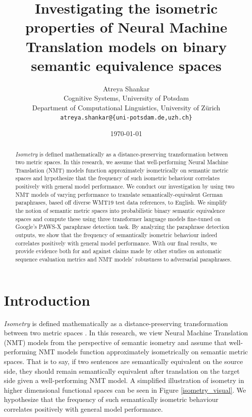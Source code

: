 \documentclass[11pt,a4paper]{article}
\title{Investigating the isometric properties of Neural Machine Translation models on binary semantic equivalence spaces}
\author{Atreya Shankar \\
  Cognitive Systems, University of Potsdam \\
  Department of Computational Linguistics, University of Zürich \\
  \texttt{atreya.shankar@\{uni-potsdam.de,uzh.ch\}}}
\date{\today}
\begin{document}
\maketitle

\begin{abstract}
  \textit{Isometry} is defined mathematically as a distance-preserving transformation between two metric spaces. In this research, we assume that well-performing Neural Machine Translation (NMT) models function approximately isometrically on semantic metric spaces and hypothesize that the frequency of such isometric behaviour correlates positively with general model performance. We conduct our investigation by using two NMT models of varying performance to translate semantically-equivalent German paraphrases, based off diverse WMT19 test data references, to English. We simplify the notion of semantic metric spaces into probabilistic binary semantic equivalence spaces and compute these using three transformer language models fine-tuned on Google's PAWS-X paraphrase detection task. By analyzing the paraphrase detection outputs, we show that the frequency of semantically isometric behaviour indeed correlates positively with general model performance. With our final results, we provide evidence both for and against claims made by other studies on automatic sequence evaluation metrics and NMT models' robustness to adversarial paraphrases.
\end{abstract}

\section{Introduction}

\textit{Isometry} is defined mathematically as a distance-preserving transformation between two metric spaces \cite{coxeter1961introduction}. In this research, we view Neural Machine Translation (NMT) models from the perspective of semantic isometry and assume that well-performing NMT models function approximately isometrically on semantic metric spaces. That is to say, if two sentences are semantically equivalent on the source side, they should remain semantically equivalent after translation on the target side given a well-performing NMT model. A simplified illustration of isometry in higher dimensional functional spaces can be seen in Figure \ref{isometry_visual}. We hypothesize that the frequency of such semantically isometric behaviour correlates positively with general model performance. 
\end{document}
